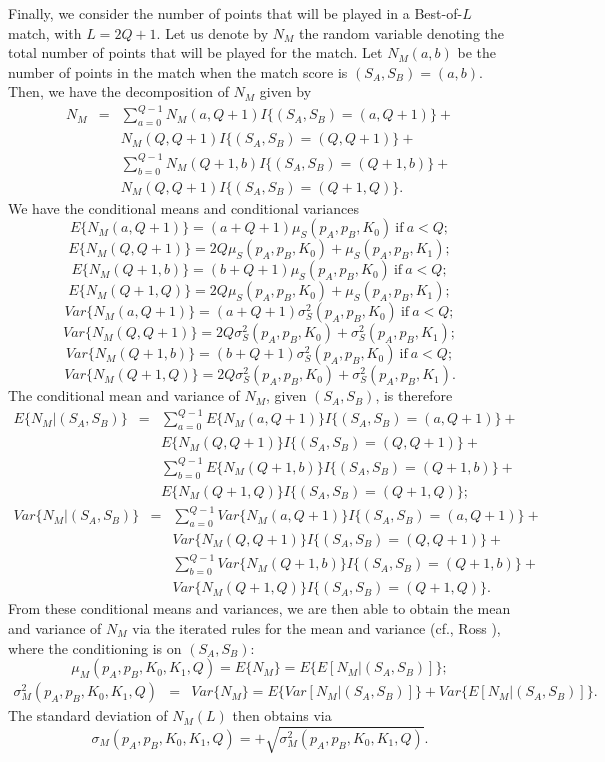 \documentclass[11pt]{article}
\theoremstyle{plain}
\theoremstyle{definition}
\begin{document}
Finally, we consider the number of points that will be played in a Best-of-$L$ match, with $L = 2Q+1$. Let us denote by $N_M$ the random variable denoting the total number of points that will be played for the match. Let $N_M(a,b)$ be the number of points in the match when the match score is $(S_A,S_B) = (a,b)$. Then, we have the decomposition of $N_M$ given by
%
\begin{eqnarray*}
    N_M & = & \sum_{a = 0}^{Q-1} N_M(a,Q+1) I\{(S_A,S_B) = (a,Q+1)\} + \\ && 
    N_M(Q,Q+1) I\{(S_A,S_B) = (Q,Q+1)\} + \\
    && \sum_{b = 0}^{Q-1} N_M(Q+1,b) I\{(S_A,S_B) = (Q+1,b)\} + \\ && 
    N_M(Q,Q+1) I\{(S_A,S_B) = (Q+1,Q)\}.
\end{eqnarray*}
%
We have the conditional means and conditional variances
%
$$E\{N_M(a,Q+1)\} = (a+Q+1) \mu_S(p_A,p_B,K_0) \ \mbox{if} \ a < Q;$$
$$E\{N_M(Q,Q+1)\} = 2Q \mu_S(p_A,p_B,K_0) + \mu_S(p_A,p_B,K_1);$$
$$E\{N_M(Q+1,b)\} = (b+Q+1) \mu_S(p_A,p_B,K_0) \ \mbox{if} \ a < Q;$$
$$E\{N_M(Q+1,Q)\} = 2Q \mu_S(p_A,p_B,K_0) + \mu_S(p_A,p_B,K_1);$$
$$Var\{N_M(a,Q+1)\} = (a+Q+1) \sigma_S^2(p_A,p_B,K_0) \ \mbox{if} \ a < Q;$$
$$Var\{N_M(Q,Q+1)\} = 2Q \sigma_S^2(p_A,p_B,K_0) + \sigma_S^2(p_A,p_B,K_1);$$
$$Var\{N_M(Q+1,b)\} = (b+Q+1) \sigma_S^2(p_A,p_B,K_0) \ \mbox{if} \ a < Q;$$
$$Var\{N_M(Q+1,Q)\} = 2Q \sigma_S^2(p_A,p_B,K_0) + \sigma_S^2(p_A,p_B,K_1).$$
%
The conditional mean and variance of $N_M$, given $(S_A,S_B)$, is therefore
%
\begin{eqnarray*}
    E\{N_M|(S_A,S_B)\} & = & \sum_{a = 0}^{Q-1} E\{N_M(a,Q+1)\}  I\{(S_A,S_B) = (a,Q+1)\} + \\ && E\{N_M(Q,Q+1)\} I\{(S_A,S_B) = (Q,Q+1)\} + \\
    && \sum_{b = 0}^{Q-1} E\{N_M(Q+1,b)\} I\{(S_A,S_B) = (Q+1,b)\} + \\ && E\{N_M(Q+1,Q)\} I\{(S_A,S_B) = (Q+1,Q)\};
\end{eqnarray*}
%
\begin{eqnarray*}
    Var\{N_M|(S_A,S_B)\} & = & \sum_{a = 0}^{Q-1} Var\{N_M(a,Q+1)\}  I\{(S_A,S_B) = (a,Q+1)\} + \\ && Var\{N_M(Q,Q+1)\} I\{(S_A,S_B) = (Q,Q+1)\} + \\
    && \sum_{b = 0}^{Q-1} Var\{N_M(Q+1,b)\} I\{(S_A,S_B) = (Q+1,b)\} + \\ && Var\{N_M(Q+1,Q)\} I\{(S_A,S_B) = (Q+1,Q)\}.
\end{eqnarray*}
%
From these conditional means and variances, we are then able to obtain the mean and variance of $N_M$ via the iterated rules for the mean and variance (cf., Ross \cite{Ross1998}), where the conditioning is on $(S_A,S_B)$:
%
$$\mu_M(p_A,p_B,K_0,K_1,Q) = E\{N_M\} = E\{E[N_M|(S_A,S_B)]\};$$
\begin{eqnarray*}
\sigma_M^2(p_A,p_B,K_0,K_1,Q) & = & Var\{N_M\}  = E\{Var[N_M|(S_A,S_B)]\} + Var\{E[N_M|(S_A,S_B)]\}.    
\end{eqnarray*}
%
The standard deviation of $N_M(L)$ then obtains via $$\sigma_M(p_A,p_B,K_0,K_1,Q) = +\sqrt{\sigma_M^2(p_A,p_B,K_0,K_1,Q)}.$$
\end{document}
